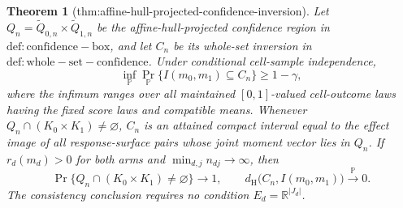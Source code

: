 \documentclass{article}
\newtheorem{theorem}{Theorem}
\begin{document}
\begin{theorem}[thm:affine-hull-projected-confidence-inversion]\label{thm:affine-hull-projected-confidence-inversion}
Let \(Q_n=\widetilde Q_{0,n}\times\widetilde Q_{1,n}\) be the affine-hull-projected confidence region in \(\mathrm{def:confidence-box}\), and let \(C_n\) be its whole-set inversion in \(\mathrm{def:whole-set-confidence}\).  Under conditional cell-sample independence,
\[
 \inf_{\mathbb P}\Pr_{\mathbb P}\{I(m_0,m_1)\subseteq C_n\}\geq1-\gamma,
\]
where the infimum ranges over all maintained \([0,1]\)-valued cell-outcome laws having the fixed score laws and compatible means.  Whenever \(Q_n\cap(K_0\times K_1)\neq\varnothing\), \(C_n\) is an attained compact interval equal to the effect image of all response-surface pairs whose joint moment vector lies in \(Q_n\).  If \(r_d(m_d)>0\) for both arms and \(\min_{d,j}n_{dj}\to\infty\), then
\[
 \Pr\{Q_n\cap(K_0\times K_1)\neq\varnothing\}\longrightarrow1,
 \qquad
 d_{\mathrm H}\bigl(C_n,I(m_0,m_1)\bigr)\xrightarrow{\mathbb P}0.
\]
The consistency conclusion requires no condition \(E_d=\mathbb R^{|J_d|}\).
\end{theorem}
\end{document}
